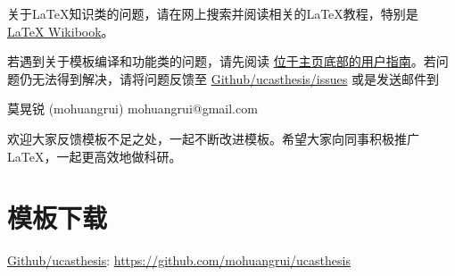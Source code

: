 关于\LaTeX{}知识类的问题，请在网上搜索并阅读相关的\LaTeX{}教程，特别是 \href{https://en.wikibooks.org/wiki/LaTeX}{\LaTeX{} Wikibook}。

若遇到关于模板编译和功能类的问题，请先阅读 \href{https://github.com/mohuangrui/ucasthesis}{位于主页底部的用户指南}。若问题仍无法得到解决，请将问题反馈至 \href{https://github.com/mohuangrui/ucasthesis/issues}{Github/ucasthesis/issues} 或是发送邮件到

\begin{center}
莫晃锐 (mohuangrui) \quad mohuangrui@gmail.com
\end{center}

欢迎大家反馈模板不足之处，一起不断改进模板。希望大家向同事积极推广\LaTeX{}，一起更高效地做科研。

\section{模板下载}

\begin{center}
    \href{https://github.com/mohuangrui/ucasthesis}{Github/ucasthesis}: \url{https://github.com/mohuangrui/ucasthesis}
\end{center}
